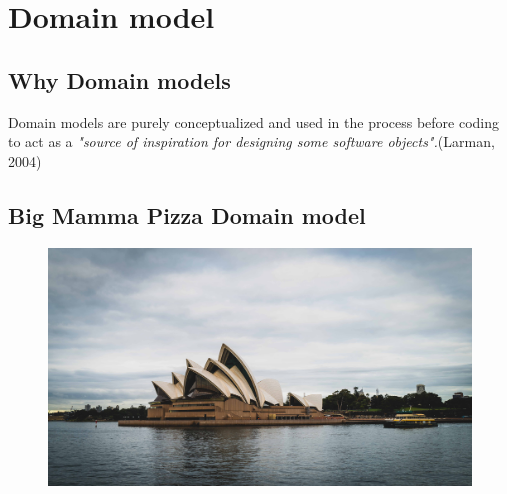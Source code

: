 \section{Domain model}
\subsection{Why Domain models}
Domain models are purely conceptualized and used in the process before coding to act as a \textit{"source of inspiration for designing some software objects".}(Larman, 2004)
\cite{larman2004applying}


\subsection{Big Mamma Pizza Domain model}
\begin{figure}[htbp]
    \center
    \includegraphics[scale=0.07]{img/photo.jpg}
    \caption{}
\end{figure}


